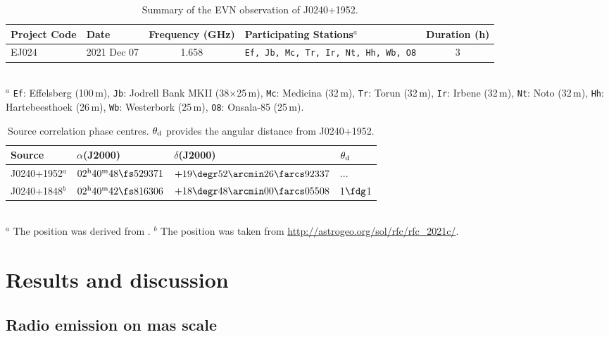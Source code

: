 \documentclass[fleqn,usenatbib]{mnras}
\begin{document}
\begin{table*}
    \centering
    \caption{Summary of the EVN observation of J0240+1952.}
    \label{tab:tab1}
    \begin{tabular}{llclc}
        \hline
        Project Code& Date         & Frequency (GHz) & Participating Stations$^{a}$               & Duration (h)  \\
        \hline
        EJ024  & 2021 Dec 07 & 1.658  &\texttt{Ef, Jb, Mc, Tr, Ir, Nt, Hh, Wb, O8} & 3       \\[2pt]
        \hline
    \end{tabular}\\
    \footnotesize{$^a$ \texttt{Ef}: Effelsberg (100\,m), \texttt{Jb}: Jodrell Bank MKII (38$\times$25\,m), \texttt{Mc}: Medicina (32\,m), \texttt{Tr}: Torun (32\,m), \texttt{Ir}: Irbene (32\,m), \texttt{Nt}: Noto (32\,m), \texttt{Hh}: Hartebeesthoek (26\,m), \texttt{Wb}: Westerbork (25\,m), \texttt{O8}: Onsala-85 (25\,m).}\\
\end{table*}

\begin{table}
    \centering
    \caption{Source correlation phase centres. $\theta_{\rm d}$ provides the angular distance from J0240+1952.}
    \label{tab:tab2}
    \begin{tabular}{llll}
        \hline
        Source           & $\alpha$(J2000)                  & $\delta$(J2000) & $\theta_{\rm d}$\\
        \hline
        J0240+1952$^{a}$         & $02^{\rm h}40^{\rm m}48\fs529371$ & $+19\degr52\arcmin26\farcs92337$ & ...\\[2pt]
        J0240+1848$^{b}$ & $02^{\rm h}40^{\rm m}42\fs816306$ & $+18\degr48\arcmin00\farcs05508$ & 1$\fdg$1 \\[2pt]
        \hline
    \end{tabular}\\
    \footnotesize{$^{a}$ The position was derived from \citet{Gaia2021}. $^{b}$ The position was taken from \url{http://astrogeo.org/sol/rfc/rfc_2021c/}.}\\
\end{table}

\section{Results and discussion}
\label{sec:section3}

\subsection{Radio emission on mas scale}
\end{document}
